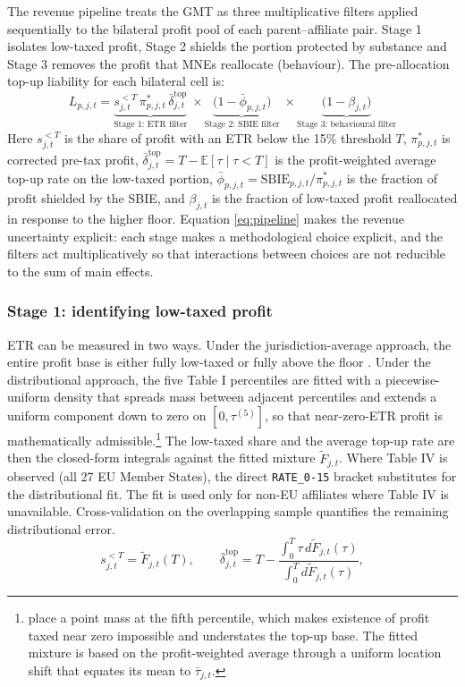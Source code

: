 \documentclass[11pt,a4paper]{article}
\newcommand{\code}[1]{\texttt{#1}}
\begin{document}
The revenue pipeline treats the GMT as three multiplicative filters applied sequentially to the bilateral profit pool of each parent--affiliate pair. Stage 1 isolates low-taxed profit, Stage 2 shields the portion protected by substance and Stage 3 removes the profit that MNEs reallocate (behaviour). The pre-allocation top-up liability for each bilateral cell is:
\begin{equation}\label{eq:pipeline}
L_{p,j,t} = \underbrace{s_{j,t}^{<T}\, \pi_{p,j,t}^{*}\, \bar{\delta}_{j,t}^{\text{top}}}_{\text{Stage 1: ETR filter}}\; \times \underbrace{\bigl(1 - \bar{\phi}_{p,j,t}\bigr)}_{\text{Stage 2: SBIE filter}}\; \times \underbrace{\bigl(1 - \beta_{j,t}\bigr)}_{\text{Stage 3: behavioural filter}}
\end{equation}
Here $s_{j,t}^{<T}$ is the share of profit with an ETR below the 15\% threshold $T$, $\pi_{p,j,t}^{*}$ is corrected pre-tax profit, $\bar{\delta}_{j,t}^{\text{top}} = T - \mathbb{E}[\tau \mid \tau<T]$ is the profit-weighted average top-up rate on the low-taxed portion, $\bar{\phi}_{p,j,t} = \text{SBIE}_{p,j,t}/\pi^{*}_{p,j,t}$ is the fraction of profit shielded by the SBIE, and $\beta_{j,t}$ is the fraction of low-taxed profit reallocated in response to the higher floor. Equation \eqref{eq:pipeline} makes the revenue uncertainty explicit: each stage makes a methodological choice explicit, and the filters act multiplicatively so that interactions between choices are not reducible to the sum of main effects.

\subsubsection{Stage 1: identifying low-taxed profit}\label{sec:stage1}

ETR can be measured in two ways. Under the jurisdiction-average approach, the entire profit base is either fully low-taxed or fully above the floor \citep{barake2022}. Under the distributional approach, the five Table I percentiles are fitted with a piecewise-uniform density that spreads mass between adjacent percentiles and extends a uniform component down to zero on $[0,\tau^{(5)}]$, so that near-zero-ETR profit is mathematically admissible.\footnote{\citet{hugger2026} place a point mass at the fifth percentile, which makes existence of profit taxed near zero impossible and understates the top-up base. The fitted mixture is based on the profit-weighted average through a uniform location shift that equates its mean to $\bar{\tau}_{j,t}$.} The low-taxed share and the average top-up rate are then the closed-form integrals against the fitted mixture $\tilde{F}_{j,t}$. Where Table IV is observed (all 27 EU Member States), the direct \code{RATE\_0-15} bracket substitutes for the distributional fit. The fit is used only for non-EU affiliates where Table IV is unavailable. Cross-validation on the overlapping sample quantifies the remaining distributional error.
\begin{equation}\label{eq:stage1}
s_{j,t}^{<T} = \tilde{F}_{j,t}(T), \qquad \bar{\delta}_{j,t}^{\text{top}} = T - \frac{\int_0^{T} \tau \, d\tilde{F}_{j,t}(\tau)}{\int_0^{T} d\tilde{F}_{j,t}(\tau)},
\end{equation}
\end{document}
